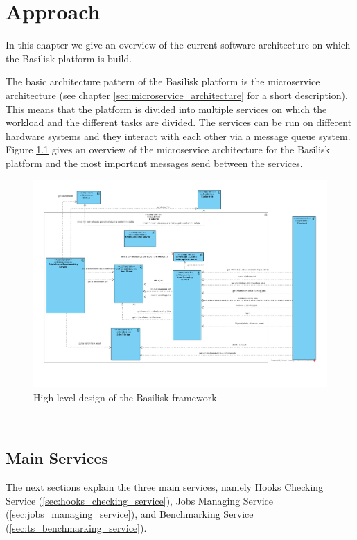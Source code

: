 \chapter{Approach}
\label{ch:approach}

In this chapter we give an overview of the current software architecture on which the Basilisk platform is build.

The basic architecture pattern of the Basilisk platform is the microservice architecture (see chapter \ref{sec:microservice_architecture} for a short description). 
This means that the platform is divided into multiple services on which the workload and the different tasks are divided.
The services can be run on different hardware systems and they interact with each other via a message queue system.
\\


Figure \ref{fig:basilisk_high_level_design} gives an overview of the microservice architecture for the Basilisk platform and the most important messages send between the services.
\begin{figure}[tbph]
	\centering
	\includegraphics[width=1.1\textwidth]{figures/basilisk_high_level_design.pdf}
	\caption{High level design of the Basilisk framework}
	\label{fig:basilisk_high_level_design}
\end{figure}
\\


\section{Main Services}
\label{sec:main_services}
The next sections explain the three main services, namely Hooks Checking Service (\ref{sec:hooks_checking_service}), Jobs Managing Service (\ref{sec:jobs_managing_service}), and \ts{} Benchmarking Service (\ref{sec:ts_benchmarking_service}).



